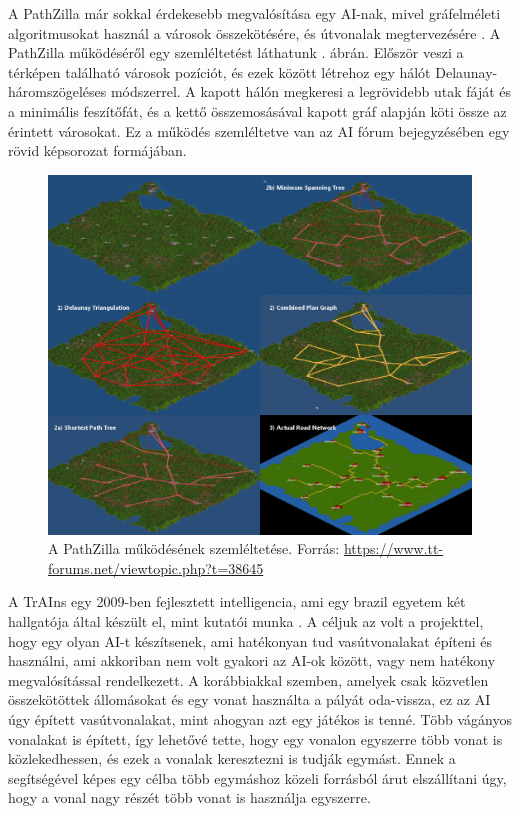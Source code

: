 A PathZilla már sokkal érdekesebb megvalósítása egy AI-nak, mivel gráfelméleti algoritmusokat használ a városok összekötésére, és útvonalak megtervezésére \cite{openttdforum}. A PathZilla működéséről egy szemléltetést láthatunk . ábrán. Először veszi a térképen található városok pozíciót, és ezek között létrehoz egy hálót Delaunay-háromszögeléses módszerrel. A kapott hálón megkeresi a legrövidebb utak fáját és a minimális feszítőfát, és a kettő összemosásával kapott gráf alapján köti össze az érintett városokat. Ez a működés szemléltetve van az AI fórum bejegyzésében egy rövid képsorozat formájában.

\begin{figure}
	\centering
	\includegraphics[width=\textwidth]{images/pathzilla.png}
	\caption{A PathZilla működésének szemléltetése. Forrás: \url{https://www.tt-forums.net/viewtopic.php?t=38645}}
	\label{fig:pathzilla}
\end{figure}

A TrAIns egy 2009-ben fejlesztett intelligencia, ami egy brazil egyetem két hallgatója által készült el, mint kutatói munka \cite{rios2009trains}. A céljuk az volt a projekttel, hogy egy olyan AI-t készítsenek, ami hatékonyan tud vasútvonalakat építeni és használni, ami akkoriban nem volt gyakori az AI-ok között, vagy nem hatékony megvalósítással rendelkezett. A korábbiakkal szemben, amelyek csak közvetlen összekötöttek állomásokat és egy vonat használta a pályát oda-vissza, ez az AI úgy épített vasútvonalakat, mint ahogyan azt egy játékos is tenné. Több vágányos vonalakat is épített, így lehetővé tette, hogy egy vonalon egyszerre több vonat is közlekedhessen, és ezek a vonalak keresztezni is tudják egymást. Ennek a segítségével képes egy célba több egymáshoz közeli forrásból árut elszállítani úgy, hogy a vonal nagy részét több vonat is használja egyszerre.

